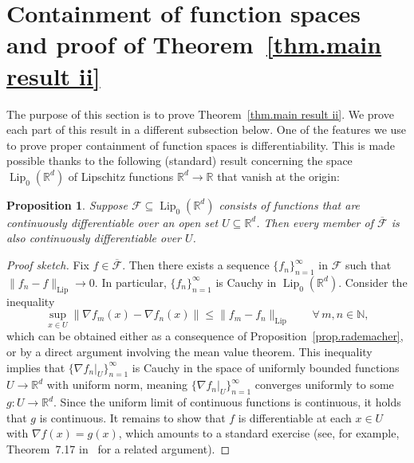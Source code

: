 \documentclass{article}
\theoremstyle{plain}
\newtheorem{proposition}[theorem]{Proposition}
\theoremstyle{definition}
\begin{document}
\section{Containment of function spaces and proof of Theorem~\ref{thm.main result ii}}
\label{sec.proof of containments}

The purpose of this section is to prove Theorem~\ref{thm.main result ii}.
We prove each part of this result in a different subsection below.
One of the features we use to prove proper containment of function spaces is differentiability.
This is made possible thanks to the following (standard) result concerning the space $\operatorname{Lip}_0(\mathbb{R}^d)$ of Lipschitz functions $\mathbb{R}^d\to\mathbb{R}$ that vanish at the origin:

\begin{proposition}
\label{prop.C^1 is Lipschitz closed}
Suppose $\mathcal{F}\subseteq\operatorname{Lip}_{0}(\mathbb{R}^d)$ consists of functions that are continuously differentiable over an open set $U\subseteq\mathbb{R}^d$.
Then every member of $\overline{\mathcal{F}}$ is also continuously differentiable over $U$.
\end{proposition}

\begin{proof}[Proof sketch]
Fix $f\in\overline{\mathcal{F}}$.
Then there exists a sequence $\{f_n\}_{n=1}^\infty$ in $\mathcal{F}$ such that $\|f_n-f\|_{\operatorname{Lip}}\to0$.
In particular, $\{f_n\}_{n=1}^\infty$ is Cauchy in $\operatorname{Lip}_{0}(\mathbb{R}^d)$.
Consider the inequality
\[
\sup_{x\in U}\|\nabla f_m(x)-\nabla f_n(x)\|
\leq \|f_m-f_n\|_{\operatorname{Lip}}
\qquad
\forall\,m,n\in\mathbb{N},
\]
which can be obtained either as a consequence of Proposition~\ref{prop.rademacher}, or by a direct argument involving the mean value theorem.
This inequality implies that $\{\nabla f_n|_U\}_{n=1}^\infty$ is Cauchy in the space of uniformly bounded functions $U\to\mathbb{R}^d$ with uniform norm, meaning $\{\nabla f_n|_U\}_{n=1}^\infty$ converges uniformly to some $g\colon U\to\mathbb{R}^d$.
Since the uniform limit of continuous functions is continuous, it holds that $g$ is continuous.
It remains to show that $f$ is differentiable at each $x\in U$ with $\nabla f(x)=g(x)$, which amounts to a standard exercise (see, for example, Theorem~7.17 in~\cite{Rudin:76} for a related argument).
\end{proof}
\end{document}
